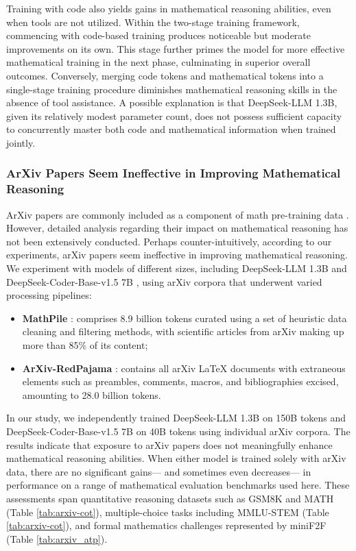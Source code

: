\begin{itemize}[topsep=0pt]
\begin{itemize}[topsep=0pt]
Training with code also yields gains in mathematical reasoning abilities, even when tools are not utilized. Within the two-stage training framework, commencing with code-based training produces noticeable but moderate improvements on its own. This stage further primes the model for more effective mathematical training in the next phase, culminating in superior overall outcomes. Conversely, merging code tokens and mathematical tokens into a single-stage training procedure diminishes mathematical reasoning skills in the absence of tool assistance. A possible explanation is that DeepSeek-LLM 1.3B, given its relatively modest parameter count, does not possess sufficient capacity to concurrently master both code and mathematical information when trained jointly.

\subsubsection{ArXiv Papers Seem Ineffective in Improving Mathematical Reasoning}

ArXiv papers are commonly included as a component of math pre-training data \citep{minerva,gpt-f,llemma,mathpile}. However, detailed analysis regarding their impact on mathematical reasoning has not been extensively conducted. Perhaps counter-intuitively, according to our experiments, arXiv papers seem ineffective in improving mathematical reasoning. We experiment with models of different sizes, including DeepSeek-LLM 1.3B and DeepSeek-Coder-Base-v1.5 7B \citep{deepseek-coder}, using arXiv corpora that underwent varied processing pipelines:

\begin{itemize}[topsep=0pt]
    \item \textbf{MathPile} \citep{mathpile}: comprises 8.9 billion tokens curated using a set of heuristic data cleaning and filtering methods, with scientific articles from arXiv making up more than 85\% of its content;
    \item \textbf{ArXiv-RedPajama} \citep{redpajama}: contains all arXiv LaTeX documents with extraneous elements such as preambles, comments, macros, and bibliographies excised, amounting to 28.0 billion tokens.
\end{itemize}

In our study, we independently trained DeepSeek-LLM 1.3B on 150B tokens and DeepSeek-Coder-Base-v1.5 7B on 40B tokens using individual arXiv corpora. The results indicate that exposure to arXiv papers does not meaningfully enhance mathematical reasoning abilities. When either model is trained solely with arXiv data, there are no significant gains— and sometimes even decreases— in performance on a range of mathematical evaluation benchmarks used here. These assessments span quantitative reasoning datasets such as GSM8K and MATH (Table \ref{tab:arxiv-cot}), multiple-choice tasks including MMLU-STEM (Table \ref{tab:arxiv-cot}), and formal mathematics challenges represented by miniF2F (Table \ref{tab:arxiv_atp}).


\end{itemize}
\end{itemize}
